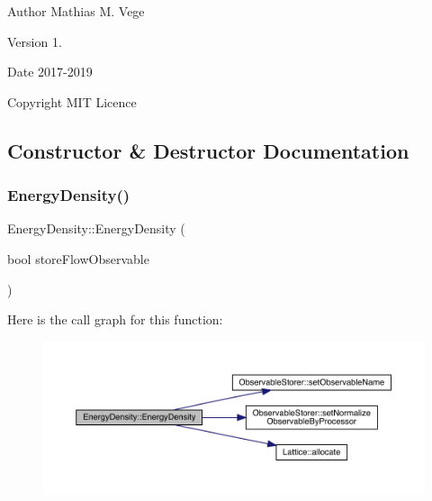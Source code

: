 \begin{DoxyAuthor}{Author}
Mathias M. Vege 
\end{DoxyAuthor}
\begin{DoxyVersion}{Version}
1. 
\end{DoxyVersion}
\begin{DoxyDate}{Date}
2017-\/2019 
\end{DoxyDate}
\begin{DoxyCopyright}{Copyright}
M\+IT Licence 
\end{DoxyCopyright}


\subsection{Constructor \& Destructor Documentation}
\mbox{\label{class_energy_density_a1d23cfe5690c9daf8b2f0ec8f6471c5f}} 
\subsubsection{\texorpdfstring{EnergyDensity()}{EnergyDensity()}}
{\footnotesize\ttfamily Energy\+Density\+::\+Energy\+Density (\begin{DoxyParamCaption}\item[{bool}]{store\+Flow\+Observable }\end{DoxyParamCaption})}

Here is the call graph for this function\+:
\nopagebreak
\begin{figure}[H]
\begin{center}
\leavevmode
\includegraphics[width=350pt]{class_energy_density_a1d23cfe5690c9daf8b2f0ec8f6471c5f_cgraph}
\end{center}
\end{figure}
\mbox{\label{class_energy_density_a307e031858ac7149f5689911f8ff22fb}} 
